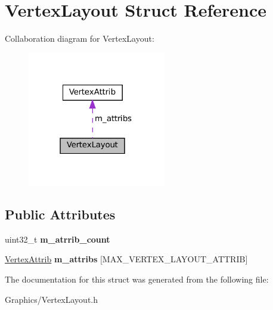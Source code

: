 \hypertarget{structVertexLayout}{}\section{Vertex\+Layout Struct Reference}
\label{structVertexLayout}


Collaboration diagram for Vertex\+Layout\+:
\nopagebreak
\begin{figure}[H]
\begin{center}
\leavevmode
\includegraphics[width=171pt]{structVertexLayout__coll__graph}
\end{center}
\end{figure}
\subsection*{Public Attributes}
\begin{DoxyCompactItemize}
\item 
\mbox{\label{structVertexLayout_ae0167daf44dc0ca211722b381cf2131d}} 
uint32\+\_\+t {\bfseries m\+\_\+atrrib\+\_\+count}
\item 
\mbox{\label{structVertexLayout_a8b029eda23e9af78a9ef8d6eec5984e8}} 
\hyperlink{structVertexAttrib}{Vertex\+Attrib} {\bfseries m\+\_\+attribs} \mbox{[}M\+A\+X\+\_\+\+V\+E\+R\+T\+E\+X\+\_\+\+L\+A\+Y\+O\+U\+T\+\_\+\+A\+T\+T\+R\+IB\mbox{]}
\end{DoxyCompactItemize}


The documentation for this struct was generated from the following file\+:\begin{DoxyCompactItemize}
\item 
Graphics/Vertex\+Layout.\+h\end{DoxyCompactItemize}

